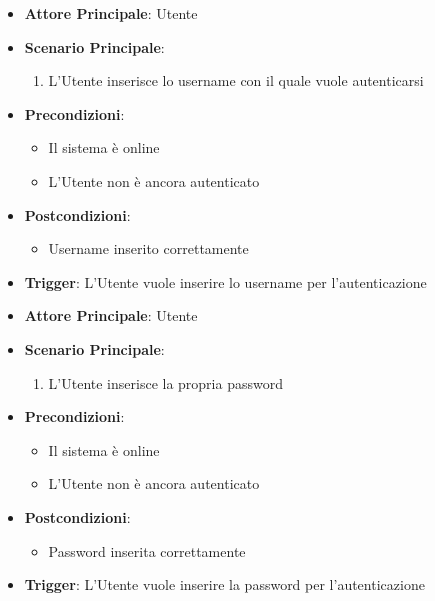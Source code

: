 \label{uc_02.1}

\begin{itemize}
    \item \textbf{Attore Principale}: Utente
    \item \textbf{Scenario Principale}:
    \begin{enumerate}
        \item L'Utente inserisce lo username con il quale vuole autenticarsi
    \end{enumerate}
    \item \textbf{Precondizioni}:
    \begin{itemize}
        \item Il sistema è online
        \item L'Utente non è ancora autenticato
    \end{itemize}
    \item \textbf{Postcondizioni}:
    \begin{itemize}
        \item Username inserito correttamente
    \end{itemize}
    \item \textbf{Trigger}: L'Utente vuole inserire lo username per l'autenticazione
\end{itemize}


\label{uc_02.2}

\begin{itemize}
    \item \textbf{Attore Principale}: Utente
    \item \textbf{Scenario Principale}:
    \begin{enumerate}
        \item L'Utente inserisce la propria password
    \end{enumerate}
    \item \textbf{Precondizioni}:
    \begin{itemize}
        \item Il sistema è online
        \item L'Utente non è ancora autenticato
    \end{itemize}
    \item \textbf{Postcondizioni}:
    \begin{itemize}
        \item Password inserita correttamente
    \end{itemize}
    \item \textbf{Trigger}: L'Utente vuole inserire la password per l'autenticazione
\end{itemize}